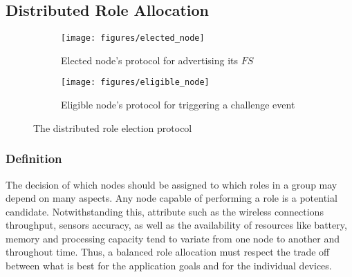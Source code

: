

 
\subsection{Distributed Role Allocation} 


\begin{figure}[t!]
	\centering
	\begin{subfigure}[b]{0.45\textwidth}
		\centering
		\texttt{[image: figures/elected\_node]}
		\caption{Elected node's protocol for advertising its $FS$}
		\label{fig:elected_node}
	\end{subfigure}%
	
	\begin{subfigure}[b]{0.55\textwidth}
		\centering
		\texttt{[image: figures/eligible\_node]}
		\caption{Eligible node's protocol for triggering a challenge event}
		\label{fig:eligible_node}
	\end{subfigure}
	\caption{The distributed role election protocol}
	\label{fig:role_allocation}
\end{figure}
 
\subsubsection{\textbf{Definition}} The decision of which nodes should be assigned to which roles in a group may depend on many aspects. Any node capable of performing a role is a potential candidate. Notwithstanding this, attribute such as the wireless connections throughput, sensors accuracy, as well as the availability of resources like battery, memory and processing capacity tend to variate from one node to another and throughout time. Thus, a balanced role allocation must respect the trade off between what is best for the application goals and for the individual devices. 

%
%	
%	
%	

